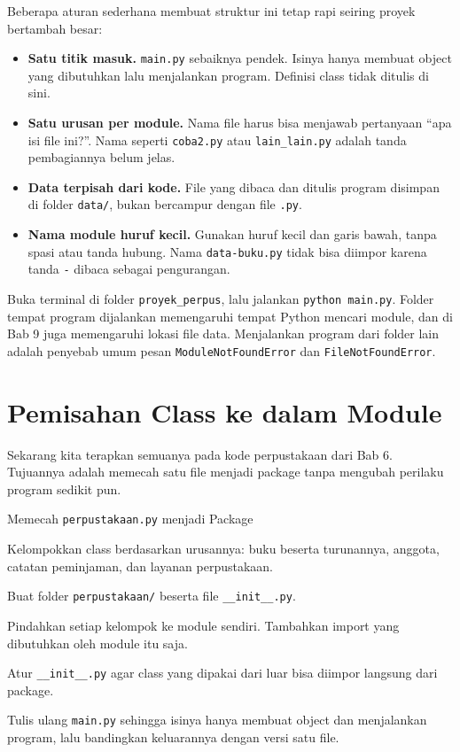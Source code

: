 Beberapa aturan sederhana membuat struktur ini tetap rapi seiring proyek bertambah besar:

\begin{itemize}
  \item \textbf{Satu titik masuk.} \texttt{main.py} sebaiknya pendek. Isinya hanya membuat object yang dibutuhkan lalu menjalankan program. Definisi class tidak ditulis di sini.
  \item \textbf{Satu urusan per module.} Nama file harus bisa menjawab pertanyaan ``apa isi file ini?''. Nama seperti \texttt{coba2.py} atau \texttt{lain\_lain.py} adalah tanda pembagiannya belum jelas.
  \item \textbf{Data terpisah dari kode.} File yang dibaca dan ditulis program disimpan di folder \texttt{data/}, bukan bercampur dengan file \texttt{.py}.
  \item \textbf{Nama module huruf kecil.} Gunakan huruf kecil dan garis bawah, tanpa spasi atau tanda hubung. Nama \texttt{data-buku.py} tidak bisa diimpor karena tanda \texttt{-} dibaca sebagai pengurangan.
\end{itemize}

\begin{tips}
Buka terminal di folder \texttt{proyek\_perpus}, lalu jalankan \texttt{python main.py}. Folder tempat program dijalankan memengaruhi tempat Python mencari module, dan di Bab 9 juga memengaruhi lokasi file data. Menjalankan program dari folder lain adalah penyebab umum pesan \texttt{ModuleNotFoundError} dan \texttt{FileNotFoundError}.
\end{tips}

\section{Pemisahan Class ke dalam Module}

Sekarang kita terapkan semuanya pada kode perpustakaan dari Bab 6. Tujuannya adalah memecah satu file menjadi package tanpa mengubah perilaku program sedikit pun.

\begin{langkah}{Memecah \texttt{perpustakaan.py} menjadi Package}
  \item Kelompokkan class berdasarkan urusannya: buku beserta turunannya, anggota, catatan peminjaman, dan layanan perpustakaan.
  \item Buat folder \texttt{perpustakaan/} beserta file \texttt{\_\_init\_\_.py}.
  \item Pindahkan setiap kelompok ke module sendiri. Tambahkan import yang dibutuhkan oleh module itu saja.
  \item Atur \texttt{\_\_init\_\_.py} agar class yang dipakai dari luar bisa diimpor langsung dari package.
  \item Tulis ulang \texttt{main.py} sehingga isinya hanya membuat object dan menjalankan program, lalu bandingkan keluarannya dengan versi satu file.
\end{langkah}

